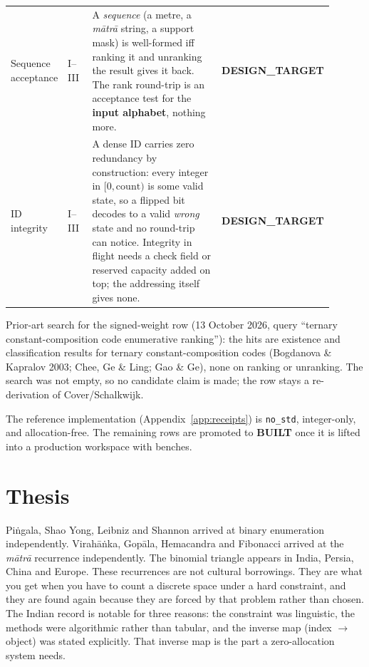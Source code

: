 \documentclass[11pt,letterpaper]{article}
\newcommand{\tagbox}[2]{\textsf{\textbf{\color{#1}#2}}}
\newcommand{\BUILT}{\tagbox{tagbuilt}{BUILT}}
\newcommand{\DESIGN}{\tagbox{tagdesign}{DESIGN\_TARGET}}
\newcommand{\skt}[1]{\textit{#1}}
\newcommand{\code}[1]{\texttt{#1}}
\theoremstyle{plain}
\theoremstyle{remark}
\begin{document}
{\begin{longtable}{@{}>{\raggedright\arraybackslash}p{0.15\linewidth}>{\raggedright\arraybackslash}p{0.08\linewidth}p{0.49\linewidth}>{\raggedright\arraybackslash}p{0.18\linewidth}@{}}
Sequence acceptance & I--III & A \emph{sequence} (a metre, a \skt{mātrā} string, a support mask) is well-formed iff ranking it and unranking the result gives it back. The rank round-trip is an acceptance test for the \textbf{input alphabet}, nothing more. & \DESIGN\\
ID integrity & I--III & A dense ID carries zero redundancy by construction: every integer in $[0,\mathrm{count})$ is some valid state, so a flipped bit decodes to a valid \emph{wrong} state and no round-trip can notice. Integrity in flight needs a check field or reserved capacity added on top; the addressing itself gives none. & \DESIGN\\
\end{longtable}
}

Prior-art search for the signed-weight row (13 October 2026, query ``ternary constant-composition code enumerative ranking''): the hits are existence and classification results for ternary constant-composition codes (Bogdanova \& Kapralov 2003; Chee, Ge \& Ling; Gao \& Ge), none on ranking or unranking. The search was not empty, so no candidate claim is made; the row stays a re-derivation of Cover/Schalkwijk.

The reference implementation (Appendix~\ref{app:receipts}) is \code{no\_std}, integer-only, and allocation-free. The remaining rows are promoted to \BUILT{} once it is lifted into a production workspace with benches.

\section{Thesis}\label{sec:thesis}

Piṅgala, Shao Yong, Leibniz and Shannon arrived at binary enumeration independently. Virahāṅka, Gopāla, Hemacandra and Fibonacci arrived at the \skt{mātrā} recurrence independently. The binomial triangle appears in India, Persia, China and Europe. These recurrences are not cultural borrowings. They are what you get when you have to count a discrete space under a hard constraint, and they are found again because they are forced by that problem rather than chosen. The Indian record is notable for three reasons: the constraint was linguistic, the methods were algorithmic rather than tabular, and the inverse map (index $\to$ object) was stated explicitly. That inverse map is the part a zero-allocation system needs.

\end{document}
